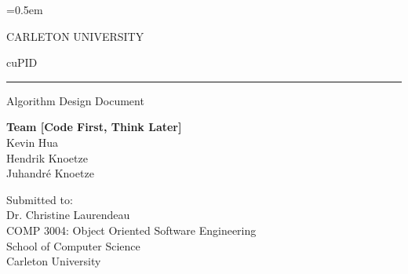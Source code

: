 \documentclass[12pt,letterpaper]{article}
\begin{document}
\renewcommand\headrule{}

\pagestyle{fancy}
\fancyhf{}
\rfoot{\thepage/\pageref{LastPage}}

\newcommand{\twodigits}[1]{\ifnum\value{#1}<10 0\fi\arabic{#1}}

\newcommand{\teamname}{Code First, Think Later}
\newcommand{\personone}{Kevin Hua}
\newcommand{\persontwo}{Hendrik Knoetze}
\newcommand{\personthree}{Juhandr\'e Knoetze}

\newcommand{\figurelabel}[1]{\label{figure:#1}}
\newcommand{\figureref}[1]{\textbf{Figure \ref{figure:#1}}}

\newcommand{\ccindent}{\hspace{1.5em}\hangindent=1.5em}
\newcommand{\tableheader}{\rowfont\bf\rowcolor{thcolor!30}}

\newcommand{\tablelabel}[1]{\label{table:#1}}
\newcommand{\tableref}[1]{\textbf{Table \ref{table:#1}}}

\everyrow{\hline}
\tabulinesep=0.5em


\thispagestyle{empty}

\begin{center}
	CARLETON UNIVERSITY
\end{center}

\vfill

\begin{center}
	{\fontsize{55pt}{55pt}\selectfont cuPID}
	\vspace{0.5em}\rule{\textwidth}{0.5pt}
	Algorithm Design Document
\end{center}

\vspace{5em}

\begin{center}
	\textbf{Team [\teamname{}]}\\
	\personone{}\\
	\persontwo{}\\
	\personthree{}
\end{center}

\vfill

\begin{center}
	Submitted to:\\
	Dr. Christine Laurendeau\\
	COMP 3004: Object Oriented Software Engineering\\
	School of Computer Science\\
	Carleton University
\end{center}
\end{document}

